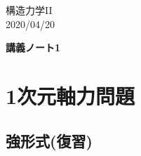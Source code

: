 \documentclass[10pt,a4j]{jarticle}
\newlength{\minitwocolumn}
\begin{document}
\newcommand{\fat}[1]{\mbox{\boldmath $#1$}}
\newcommand{\D}{\partial}
\newcommand{\w}{\omega}
\newcommand{\ga}{\alpha}
\newcommand{\gb}{\beta}
\newcommand{\gx}{\xi}
\newcommand{\gz}{\zeta}
\newcommand{\vhat}[1]{\hat{\fat{#1}}}
\newcommand{\spc}{\vspace{0.7\baselineskip}}
\newcommand{\halfspc}{\vspace{0.3\baselineskip}}

\newcommand{\twofig}[2]
 {
   \begin{figure}
     \begin{minipage}[t]{\minitwocolumn}
         \begin{center}   #1
         \end{center}
     \end{minipage}
         \hspace{\columnsep}
     \begin{minipage}[t]{\minitwocolumn}
         \begin{center} #2
         \end{center}
     \end{minipage}
   \end{figure}
 }
\begin{flushright}
構造力学II\\ 2020/04/20
\end{flushright}
\begin{center}
	{\LARGE \bf 講義ノート1} \\
\end{center}
\section{1次元軸力問題}
\subsection{強形式(復習)}
\end{document}
